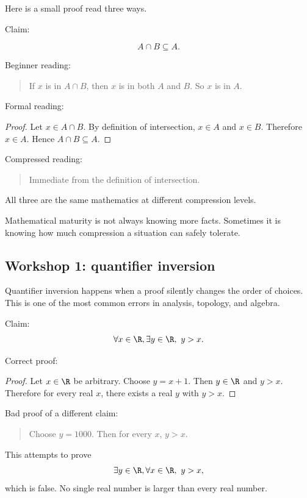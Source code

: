 Here is a small proof read three ways.

Claim:

\[
A\cap B\subseteq A.
\]

Beginner reading:

\begin{quote}
If $x$ is in $A\cap B$, then $x$ is in both $A$ and $B$. So $x$ is in $A$.
\end{quote}

Formal reading:

\begin{proof}
Let $x\in A\cap B$. By definition of intersection, $x\in A$ and $x\in B$.
Therefore $x\in A$. Hence $A\cap B\subseteq A$.
\end{proof}

Compressed reading:

\begin{quote}
Immediate from the definition of intersection.
\end{quote}

All three are the same mathematics at different compression levels.

\begin{aestheticbox}
Mathematical maturity is not always knowing more facts. Sometimes it is knowing
how much compression a situation can safely tolerate.
\end{aestheticbox}

\subsection{Workshop 1: quantifier inversion}

Quantifier inversion happens when a proof silently changes the order of choices. This is one of the most common errors in analysis, topology, and algebra.

Claim:
\[
\forall x\in\R,\exists y\in\R,\ y>x.
\]

Correct proof:

\begin{proof}
Let $x\in\R$ be arbitrary. Choose $y=x+1$. Then $y\in\R$ and $y>x$. Therefore for every real $x$, there exists a real $y$ with $y>x$.
\end{proof}

Bad proof of a different claim:

\begin{quote}
Choose $y=1000$. Then for every $x$, $y>x$.
\end{quote}

This attempts to prove
\[
\exists y\in\R,\forall x\in\R,\ y>x,
\]
which is false. No single real number is larger than every real number.

